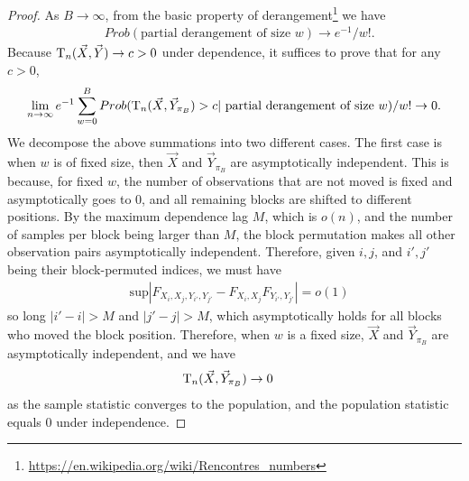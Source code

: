 \begin{proof}
As $B \rightarrow \infty$, from the basic property of derangement\footnote{\url{https://en.wikipedia.org/wiki/Rencontres_numbers}} we have
\begin{align*}
&Prob(\mbox{partial derangement of size $w$}) \rightarrow e^{-1} / w!. 
\end{align*}
Because $\mathrm{T}_{n}(\vec{X}, \vec{Y}) \rightarrow c >0$ under dependence, it suffices to prove that for any $c >0$,
\begin{align}
\label{eq:permconsistency}
\lim_{n\rightarrow \infty} e^{-1}\sum_{w=0}^{B} Prob(\mathrm{T}_{n}(\vec{X}, \vec{Y}_{\pi_B})  > c | \mbox{ partial derangement of size $w$}) / w! \rightarrow 0.
\end{align}
We decompose the above summations into two different cases. The first case is when $w$ is of fixed size, then $\vec{X}$ and $\vec{Y}_{\pi_B}$ are asymptotically independent. This is because, for fixed $w$, the number of observations that are not moved is fixed and asymptotically goes to $0$, and all remaining blocks are shifted to different positions. By the maximum dependence lag $M$, which is $o(n)$, and the number of samples per block being larger than $M$, the block permutation makes all other observation pairs asymptotically independent. Therefore, given $i,j$, and $i',j'$ being their block-permuted indices, we must have 
\begin{align*}
       & \mbox{sup} | F_{X_i,X_j, Y_{i'}, Y_{j'}} - F_{X_i,X_j}F_{Y_{i'},Y_{j'}}|=o(1)
    \end{align*}
so long $|i'-i|>M$ and $|j'-j|>M$, which asymptotically holds for all blocks who moved the block position. Therefore, when $w$ is a fixed size, $\vec{X}$ and $\vec{Y}_{\pi_B}$ are asymptotically independent, and we have
\begin{align*}
       & \mathrm{T}_{n}(\vec{X}, \vec{Y}_{\pi_B}) \rightarrow 0
    \end{align*}
as the sample statistic converges to the population, and the population statistic equals $0$ under independence.


\end{proof}
